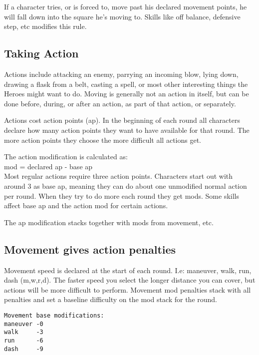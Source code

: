 If a character tries, or is forced to, move past his declared movement points, he will fall down into the square he's moving to. Skills like off balance, defensive step, etc modifies this rule.




\subsection*{Taking Action}
Actions include attacking an enemy, parrying an incoming blow, lying down, drawing a flask from a belt, casting a spell, or most other interesting things the Heroes might want to do. Moving is generally not an action in itself, but can be done before, during, or after an action, as part of that action, or separately.

Actions cost action points (ap). In the beginning of each round all characters declare how many action points they want to have available for that round. The more action points they choose the more difficult all actions get.

The action modification is calculated as: \\
mod = declared ap - base ap \\
Most regular actions require three action points. Characters start out with around 3 as base ap, meaning they can do about one unmodified normal action per round. When they try to do more each round they get mods. Some skills affect base ap and the action mod for certain actions.

The ap modification stacks together with mods from movement, etc.


\subsection*{Movement gives action penalties}
Movement speed is declared at the start of each round. I.e: maneuver, walk, run, dash (m,w,r,d). The faster speed you select the longer distance you can cover, but actions will be more difficult to perform. Movement mod penalties stack with all penalties and set a baseline difficulty on the mod stack for the round.

\begin{verbatim}
Movement base modifications:
maneuver -0
walk     -3
run      -6
dash     -9
\end{verbatim}


